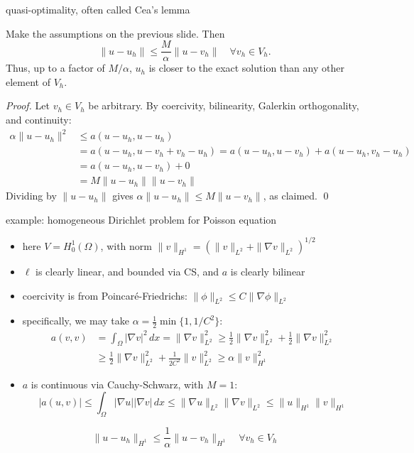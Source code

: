 \documentclass[10pt,
               svgnames,
               hyperref={colorlinks,
                         citecolor=DeepPink4,
                         linkcolor=FireBrick,
                         urlcolor=blue},
               usepdftitle=false]{beamer}
\newcommand{\grad}{\nabla}
\begin{document}
\begin{frame}{quasi-optimality, often called Cea's lemma}

\begin{lemma}
Make the assumptions on the previous slide.  Then
	$$\|u-u_h\| \le \frac{M}{\alpha} \|u-v_h\| \quad \forall v_h \in V_h.$$
Thus, up to a factor of $M/\alpha$, \alert{$u_h$ is closer to the exact solution} than any other element of $V_h$.
\end{lemma}

{\small
\emph{Proof.}  Let $v_h\in V_h$ be arbitrary.  By coercivity, bilinearity, Galerkin orthogonality, and continuity:
\begin{align*}
\alpha \|u-u_h\|^2 &\le a(u-u_h,u-u_h) \\
&= a(u-u_h,u-v_h+v_h-u_h) = a(u-u_h,u-v_h) + a(u-u_h,v_h-u_h) \\
&= a(u-u_h,u-v_h) + 0 \\
&= M \|u-u_h\| \|u-v_h\|
\end{align*}
Dividing by $\|u-u_h\|$ gives $\alpha \|u-u_h\| \le M \|u-v_h\|$, as claimed. \hfill \qed
}
\end{frame}


\begin{frame}{example: homogeneous Dirichlet problem for Poisson equation}

\begin{itemize}
\item here $V=H_0^1(\Omega)$, with norm $\|v\|_{H^1} = \left(\|v\|_{L^2} + \|\grad v\|_{L^2}\right)^{1/2}$
\item $\ell$ is clearly linear, and bounded via CS, and $a$ is clearly bilinear
\item coercivity is from Poincar\'e-Friedrichs: $\|\phi\|_{L^2} \le C \|\grad\phi\|_{L^2}$
\item specifically, we may take $\alpha=\frac{1}{2} \min\{1,1/C^2\}$:
\begin{align*}
a(v,v) &= \int_\Omega |\grad v|^2\,dx = \|\grad v\|_{L^2}^2 \ge \frac{1}{2} \|\grad v\|_{L^2}^2 + \frac{1}{2} \|\grad v\|_{L^2}^2 \\
&\ge \frac{1}{2} \|\grad v\|_{L^2}^2 + \frac{1}{2C^2} \|v\|_{L^2}^2 \ge \alpha \|v\|_{H^1}^2
\end{align*}
\item $a$ is continuous via Cauchy-Schwarz, with $M=1$:
	$$|a(u,v)| \le \int_\Omega |\grad u||\grad v|\,dx \le \|\grad u\|_{L^2} \|\grad v\|_{L^2} \le \|u\|_{H^1} \|v\|_{H^1}$$
\end{itemize}

\vspace{-2mm}
\begin{corollary}
	$$\|u-u_h\|_{H^1} \le \frac{1}{\alpha} \|u-v_h\|_{H^1} \quad \forall v_h\in V_h$$
\end{corollary}
\end{frame}
\end{document}
